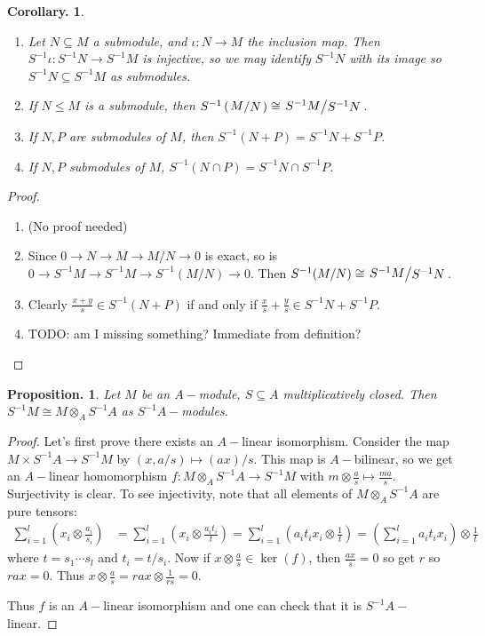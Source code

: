 \documentclass[11pt, a4paper]{memoir}
\theoremstyle{change}
\newtheorem{corollary}[theorem]{Corollary.}
\newtheorem{proposition}[theorem]{Proposition.}
\theoremstyle{plain}
\theoremstyle{nonumberplain}
\newtheorem{proof}{Proof}
\newcommand{\quot}[2]{\mathchoice{\left.\raisebox{0.10em}{$#1$}\middle/\raisebox{-0.10em}{$#2$}\right.}
                                 {\left.\raisebox{0.04em}{$#1$}\middle/\raisebox{-0.04em}{$#2$}\right.}
                                 {\left.\raisebox{0.01em}{$#1$}\middle/\raisebox{-0.01em}{$#2$}\right.}
                                 {\left.\raisebox{0em}{$#1$}\middle/\raisebox{0em}{$#2$}\right.}}
\numberwithin{equation}{section}
\begin{document}
\begin{corollary}
    \begin{enumerate}[nolistsep]
        \item Let $N\subseteq M$ a submodule, and $\iota:N\to M$ the inclusion map.
            Then $S^{-1}\iota:S^{-1}N\to S^{-1}M$ is injective, so we may identify $S^{-1}N$ with its image so $S^{-1}N\subseteq S^{-1}M$ as submodules.
        \item If $N\leq M$ is a submodule, then $S^{-1}\left(\quot{M}{N}\right)\cong\quot{S^{-1}M}{S^{-1}N}$.
        \item If $N,P$ are submodules of $M$, then $S^{-1}(N+P)=S^{-1}N+S^{-1}P$.
        \item If $N,P$ submodules of $M$, $S^{-1}(N\cap P)=S^{-1}N\cap S^{-1}P$.
    \end{enumerate}
\end{corollary}
\begin{proof}
    \begin{enumerate}[nolistsep]
        \item (No proof needed)
        \item Since $0\to N\to M\to M/N\to 0$ is exact, so is $0\to S^{-1}M\to S^{-1}M\to S^{-1}(M/N)\to 0$.
            Then $S^{-1}(M/N)\cong \quot{S^{-1}M}{S^{-1}N}$.
        \item Clearly $\frac{x+y}{s}\in S^{-1}(N+P)$ if and only if $\frac{x}{s}+\frac{y}{s}\in S^{-1}N+S^{-1}P$.
        \item TODO: am I missing something? Immediate from definition?
    \end{enumerate}
\end{proof}
\begin{proposition}
    Let $M$ be an $A-$module, $S\subseteq A$ multiplicatively closed.
    Then $S^{-1}M\cong M\otimes_A S^{-1}A$ as $S^{-1}A-$modules.
\end{proposition}
\begin{proof}
    Let's first prove there exists an $A-$linear isomorphism.
    Consider the map $M\times S^{-1}A\to S^{-1}M$ by $(x,a/s)\mapsto (ax)/s$.
    This map is $A-$bilinear, so we get an $A-$linear homomorphism $f:M\otimes_A S^{-1}A\to S^{-1}M$ with $m\otimes\frac{a}{s}\mapsto\frac{ma}{s}$.
    Surjectivity is clear.
    To see injectivity, note that all elements of $M\otimes_A S^{-1}A$ are pure tensors:
    \begin{align*}
        \sum_{i=1}^l\left(x_i\otimes\frac{a_i}{s_i}\right)&=\sum_{i=1}^l\left(x_i\otimes \frac{a_it_i}{t}\right)= \sum_{i=1}^l\left(a_it_ix_i\otimes\frac{1}{t}\right)=\left(\sum_{i=1}^l a_it_ix_i\right)\otimes\frac{1}{t}
    \end{align*}
    where $t=s_1\cdots s_l$ and $t_i=t/s_i$.
    Now if $x\otimes\frac{a}{s}\in\ker(f)$, then $\frac{ax}{s}=0$ so get $r$ so $rax=0$.
    Thus $x\otimes\frac{a}{s}=rax\otimes\frac{1}{rs}=0$.

    Thus $f$ is an $A-$linear isomorphism and one can check that it is $S^{-1}A-$linear.
\end{proof}
\end{document}
